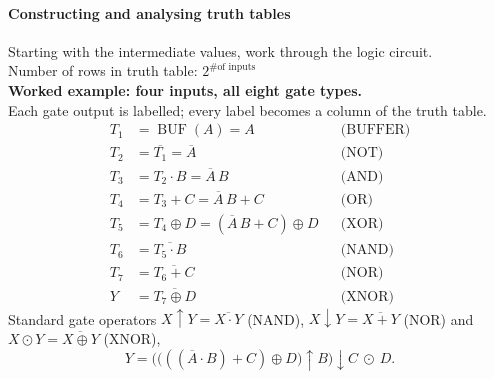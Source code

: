 \documentclass[a4paper,12pt]{article}
\begin{document}
\paragraph{Constructing and analysing truth tables}
Starting with the intermediate values, work through the logic circuit. \\
Number of rows in truth table: $2^\text{\# of inputs}$\\
\textbf{Worked example: four inputs, all eight gate types.}\\
Each gate output is labelled; every label becomes a column of the truth table.
\[
\begin{aligned}
T_1 &= \operatorname{BUF}(A) = A &&\text{(BUFFER)}\\
T_2 &= \overline{T_1} = \overline{A} &&\text{(NOT)}\\
T_3 &= T_2 \cdot B = \overline{A}\,B &&\text{(AND)}\\
T_4 &= T_3 + C = \overline{A}\,B + C &&\text{(OR)}\\
T_5 &= T_4 \oplus D = (\overline{A}\,B + C)\oplus D &&\text{(XOR)}\\
T_6 &= \overline{T_5 \cdot B} &&\text{(NAND)}\\
T_7 &= \overline{T_6 + C} &&\text{(NOR)}\\
Y   &= \overline{T_7 \oplus D} &&\text{(XNOR)}
\end{aligned}
\]
Standard gate operators
$X\uparrow Y=\overline{X\cdot Y}$ (NAND), $X\downarrow Y=\overline{X+Y}$ (NOR)
and $X\odot Y=\overline{X\oplus Y}$ (XNOR),
\[
Y=\Big(\big(((\overline{A}\cdot B)+C)\oplus D\big)\uparrow B\Big)\downarrow C\ \odot\ D .
\]
\end{document}
